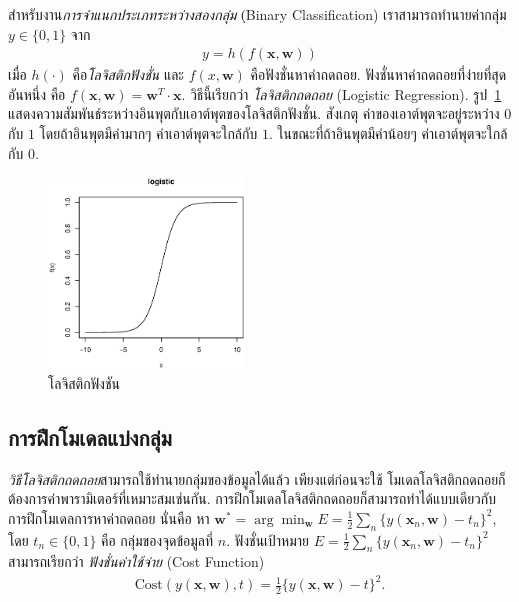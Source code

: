 สำหรับงาน\textit{การจำแนกประเภทระหว่างสองกลุ่ม} (ฺBinary Classification) 
  
เราสามารถทำนายค่ากลุ่ม $y \in \{0, 1\}$ จาก
\begin{eqnarray}
   y = h( f(\mathbf{x}, \mathbf{w}) )
\label{eq: logistic regression}
\end{eqnarray}
เมื่อ $h(\cdot)$ คือ\textit{โลจิสติกฟังชั่น} และ $f(x, \mathbf{w})$ คือฟังชั่นหาค่าถดถอย.
ฟังชั่นหาค่าถดถอยที่ง่ายที่สุดอันหนึ่ง คือ $f(\mathbf{x}, \mathbf{w}) = \mathbf{w}^T \cdot \mathbf{x}$.
วิธีนี้เรียกว่า \textit{โลจิสติกถดถอย} (Logistic Regression). 
 
รูป~\ref{fig: linear logistic} แสดงความสัมพันธ์ระหว่างอินพุตกับเอาต์พุตของโลจิสติกฟังชั่น.
สังเกตุ ค่าของเอาต์พุตจะอยู่ระหว่าง $0$ กับ $1$ โดยถ้าอินพุตมีค่ามากๆ ค่าเอาต์พุตจะใกล้กับ $1$.
ในขณะที่ถ้าอินพุตมีค่าน้อยๆ ค่าเอาต์พุตจะใกล้กับ $0$.

%
\begin{figure}
\begin{center}
\includegraphics[height=2in]{03Linear/classLogistic.eps}
\end{center}
\caption{โลจิสติกฟังชัน}
\label{fig: linear logistic}
\end{figure}
%

\subsection{การฝึกโมเดลแบ่งกลุ่ม}
\label{sec: train binary classification}

\textit{วิธีโลจิสติกถดถอย}สามารถใช้ทำนายกลุ่มของข้อมูลได้แล้ว
เพียงแต่ก่อนจะใช้ โมเดลโลจิสติกถดถอยก็ต้องการค่าพารามิเตอร์ที่เหมาะสมเช่นกัน.
การฝึกโมเดลโลจิสติกถดถอยก็สามารถทำได้แบบเดียวกับการฝึกโมเดลการหาค่าถดถอย 
นั่นคือ หา $\mathbf{w}^* = \arg \min_{\mathbf{w}} E = \frac{1}{2} \sum_n \{ y(\mathbf{x}_n, \mathbf{w}) - t_n \}^2$, 
โดย $t_n \in \{0, 1\}$ คือ กลุ่มของจุดข้อมูลที่ $n$.
ฟังชั่นเป้าหมาย $E = \frac{1}{2} \sum_n \{ y(\mathbf{x}_n, \mathbf{w}) - t_n \}^2$ สามารถเรียกว่า \textit{ฟังชั่นค่าใช้จ่าย} (Cost Function)
\begin{eqnarray}
   \mathrm{Cost}( y(\mathbf{x}, \mathbf{w}), t) = \frac{1}{2} \{ y(\mathbf{x}, \mathbf{w}) - t\}^2.
\label{eq: linear cost function regression}
\end{eqnarray}

